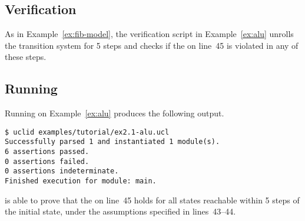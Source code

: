 \subsection{Verification}
As in Example~\ref{ex:fib-model}, the verification script in Example~\ref{ex:alu} unrolls the transition system for 5 steps and checks if the  on line~45 is violated in any of these steps.

\subsection{Running \uclid{}}

Running \uclid{} on Example~\ref{ex:alu} produces the following output.

\begin{Verbatim}[frame=single, samepage=true]
$ uclid examples/tutorial/ex2.1-alu.ucl
Successfully parsed 1 and instantiated 1 module(s).
6 assertions passed.
0 assertions failed.
0 assertions indeterminate.
Finished execution for module: main.
\end{Verbatim}

\uclid{} is able to prove that the  on line~45 holds for all states reachable within 5 steps of the initial state, under the assumptions specified in lines~43--44.
